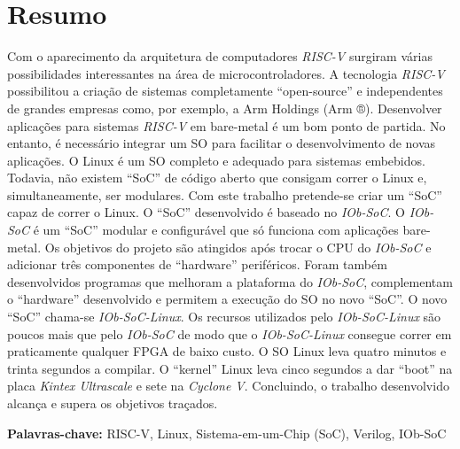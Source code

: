 \cleardoubleoddpage

\chapter*{Resumo}
\thispagestyle{empty} %

Com o aparecimento da arquitetura de computadores \textit{RISC-V} surgiram várias possibilidades interessantes na área de microcontroladores. A tecnologia \textit{RISC-V} possibilitou a criação de sistemas completamente “open-source” e independentes de grandes empresas como, por exemplo, a Arm Holdings (Arm ®). Desenvolver aplicações para sistemas \textit{RISC-V} em bare-metal é um bom ponto de partida. No entanto, é necessário integrar um SO para facilitar o desenvolvimento de novas aplicações. O Linux é um SO completo e adequado para sistemas embebidos. Todavia, não existem “SoC” de código aberto que consigam correr o Linux e, simultaneamente, ser modulares.  
%  
Com este trabalho pretende-se criar um “SoC” capaz de correr o Linux. O “SoC” desenvolvido é baseado no \textit{IOb-SoC}. O \textit{IOb-SoC} é um “SoC” modular e configurável que só funciona com aplicações bare-metal. Os objetivos do projeto são atingidos após trocar o CPU do \textit{IOb-SoC} e adicionar três componentes de “hardware” periféricos. Foram também desenvolvidos programas que melhoram a plataforma do \textit{IOb-SoC}, complementam o “hardware” desenvolvido e permitem a execução do SO no novo “SoC”. O novo “SoC” chama-se \textit{IOb-SoC-Linux}.  
%  
Os recursos utilizados pelo \textit{IOb-SoC-Linux} são poucos mais que pelo \textit{IOb-SoC} de modo que o \textit{IOb-SoC-Linux} consegue correr em praticamente qualquer FPGA de baixo custo. O SO Linux leva quatro minutos e trinta segundos a compilar. O “kernel” Linux leva cinco segundos a dar “boot” na placa \textit{Kintex Ultrascale} e sete na \textit{Cyclone V}. Concluindo, o trabalho desenvolvido alcança e supera os objetivos traçados.

\vfill

\textbf{\Large Palavras-chave:} RISC-V, Linux, Sistema-em-um-Chip (SoC), Verilog, IOb-SoC

